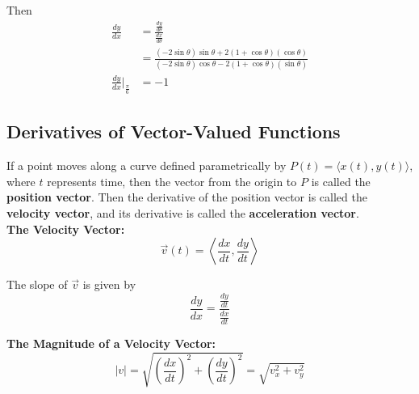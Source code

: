 \documentclass{article}
\begin{document}
            \noindent Then \\

            \begin{align*}
                \frac{dy}{dx} &= \frac{\frac{dy}{d\theta}}{\frac{dx}{d\theta}} \\
                &= \frac{(-2\sin\theta)\sin\theta+2(1+\cos\theta)(\cos\theta)}{(-2\sin\theta)\cos\theta-2(1+\cos\theta)(\sin\theta)} \\
                \frac{dy}{dx}\Bigr|_{\frac{\pi}{6}} &= -1
            \end{align*}


        \subsection{Derivatives of Vector-Valued Functions}
            If a point moves along a curve defined parametrically by $P(t)=\langle x(t), y(t)\rangle$,
            where $t$ represents time, then the vector from the origin to $P$ is called the
            \textbf{position vector}. Then the derivative of the position vector is called the
            \textbf{velocity vector}, and its derivative is called the \textbf{acceleration vector}.  \\

            \noindent \color{purple} \textbf{The Velocity Vector:} \color{black} \\

            \begin{equation*}
                \overrightarrow{v}(t) = \left\langle\frac{dx}{dt},\frac{dy}{dt}\right\rangle
            \end{equation*}

            \noindent The slope of $\overrightarrow{v}$ is given by \\

            \begin{equation*}
                \frac{dy}{dx} = \frac{\frac{dy}{dt}}{\frac{dx}{dt}}
            \end{equation*}

            \noindent \color{purple} \textbf{The Magnitude of a Velocity Vector:} \color{black} \\

            \begin{equation*}
                |v| = \sqrt{\left(\frac{dx}{dt}\right)^2+\left(\frac{dy}{dt}\right)^2} = \sqrt{v^2_x+v^2_y}
            \end{equation*}
\end{document}
